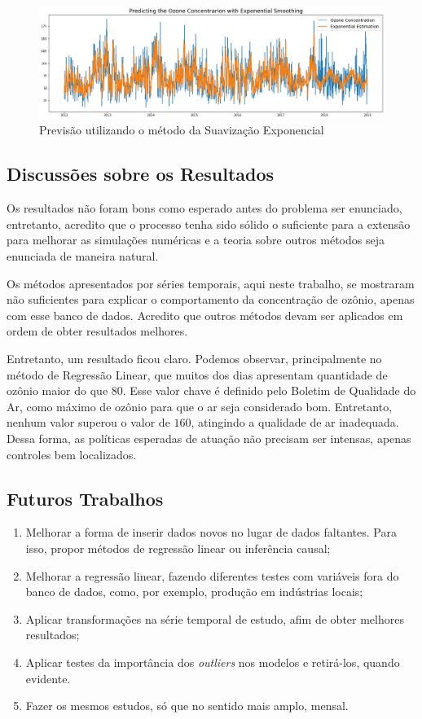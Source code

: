 \begin{figure}
    \includegraphics[width=\linewidth]{img/graphic7.png}
    \caption{Previsão utilizando o método da Suavização Exponencial}
    \label{exp-estimation}
\end{figure}

\subsection{Discussões sobre os Resultados}

Os resultados não foram bons como esperado antes do problema ser enunciado,
entretanto, acredito que o processo tenha sido sólido o suficiente para a
extensão para melhorar as simulações numéricas e a teoria sobre outros métodos
seja enunciada de maneira natural. 

Os métodos apresentados por séries temporais, aqui neste trabalho, se
mostraram não suficientes para explicar o comportamento da concentração de
ozônio, apenas com esse banco de dados. Acredito que outros métodos devam ser
aplicados em ordem de obter resultados melhores. 

Entretanto, um resultado ficou claro. Podemos observar, principalmente no
método de Regressão Linear, que muitos dos dias apresentam quantidade de
ozônio maior do que $80$. Esse valor chave é definido pelo Boletim de
Qualidade do Ar, como máximo de ozônio para que o ar seja considerado bom.
Entretanto, nenhum valor superou o valor de $160$, atingindo a qualidade de ar
inadequada. Dessa forma, as políticas esperadas de atuação não precisam ser
intensas, apenas controles bem localizados. 

\subsection{Futuros Trabalhos}

\begin{enumerate}
    \item Melhorar a forma de inserir dados novos no lugar de dados faltantes.
    Para isso, propor métodos de regressão linear ou inferência causal;
    \item Melhorar a regressão linear, fazendo diferentes testes com variáveis
    fora do banco de dados, como, por exemplo, produção em indústrias locais; 
    \item Aplicar transformações na série temporal de estudo, afim de obter
    melhores resultados;
    \item Aplicar testes da importância dos \textit{outliers} nos modelos e
    retirá-los, quando evidente.
    \item Fazer os mesmos estudos, só que no sentido mais amplo, mensal. 
\end{enumerate}